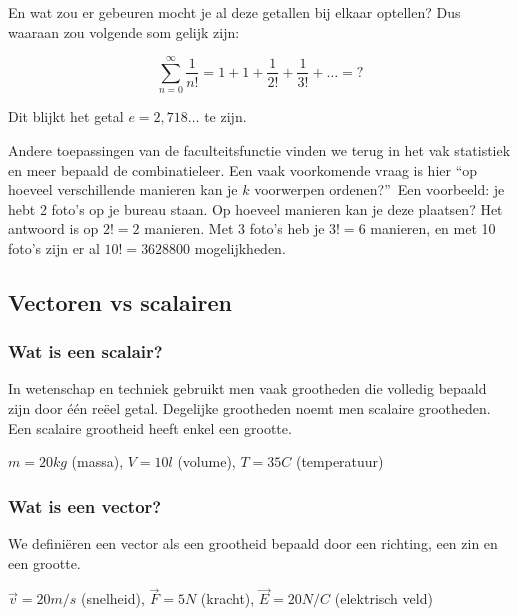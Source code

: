 En wat zou er gebeuren mocht je al deze getallen bij elkaar optellen? Dus waaraan zou volgende som gelijk zijn:

\begin{equation*}
\sum_{n=0}^{\infty} \frac{1}{n!} = 1+1+\frac{1}{2!}+\frac{1}{3!}+\ldots=?
\end{equation*}

Dit blijkt het getal $e=2,718\ldots$ te zijn.

Andere toepassingen van de faculteitsfunctie vinden we terug in het vak statistiek en meer bepaald de combinatieleer. Een vaak voorkomende vraag is hier \textquotedblleft op hoeveel verschillende manieren kan je $k$ voorwerpen ordenen?\textquotedblright \  Een voorbeeld: je hebt 2 foto's op je bureau staan. Op hoeveel manieren kan je deze plaatsen? Het antwoord is op $2!=2$ manieren. Met 3 foto's heb je $3!=6$ manieren, en met 10 foto's zijn er al $10!=3628800$ mogelijkheden.

\subsection{Vectoren vs scalairen}
\subsubsection{Wat is een scalair?}
In wetenschap en techniek gebruikt men vaak grootheden die volledig bepaald zijn door \'e\'en re\"eel getal. Degelijke grootheden noemt men scalaire grootheden. Een scalaire grootheid heeft enkel een grootte.

\begin{voorbeeld}
$m=20kg$ (massa), $V=10l$ (volume), $T=35$\textdegree$C$ (temperatuur)
\end{voorbeeld}

\subsubsection{Wat is een vector?}

\begin{definitie}
	We defini\"eren een vector als een grootheid bepaald door een richting, een zin en een grootte.
\end{definitie}

\begin{voorbeeld}
	$\vec{v}=20 m/s$ (snelheid), $\vec{F}=5N$ (kracht), $\vec{E}=20 N/C$ (elektrisch veld)
\end{voorbeeld}


